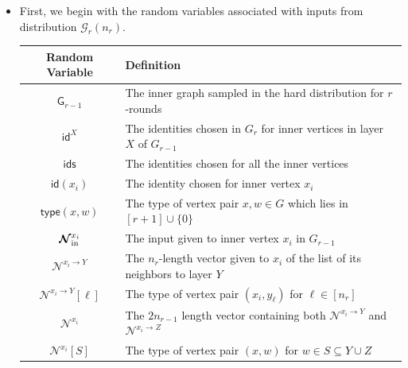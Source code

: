 \documentclass[11pt]{article}
\theoremstyle{definition}
\newcommand{\rv}[1]{\ensuremath{{\mathsf{#1}}}\xspace}
\newcommand{\rtypeval}[1]{\ensuremath{\rv{type}(#1)}}
\newcommand{\rNbtogether}[2]{\ensuremath{\bm{\mathcal{N}}^{#1_{#2}}}}
\newcommand{\rNinner}[2]{\ensuremath{\bm{\mathcal{N}}_{\textnormal{in}}^{#1_{#2}}}}
\newcommand{\cG}{\ensuremath{\mathcal{G}}}
\newcommand{\ridlayer}[1]{\ensuremath{\rv{id}^{#1}}}
\newcommand{\rG}{\ensuremath{\rv{G}}}
\newcommand{\rid}[1]{\ensuremath{\rv{id}(#1)}}
\newcommand{\rids}{\ensuremath{\rv{ids}}}
\newcommand{\rNbhood}[3]{\ensuremath{\bm{\mathcal{N}}^{#1_{#3} \to #2}}}
\begin{document}
\begin{itemize}
\item First, we begin with the random variables associated with inputs from distribution $\cG_r(n_r)$.
\begin{center}
\begin{tabular}{|c|p{10cm}|}
	\hline
\textbf{Random Variable}  & \textbf{Definition} \\
	\hline
$\rG_{r-1}$ & The inner graph sampled in the hard distribution for $r$-rounds \\
$\ridlayer{X}$ & The identities chosen in $G_r$ for inner vertices in layer $X$ of $G_{r-1}$ \\
$\rids$ & The identities chosen for all the inner vertices \\
$\rid{x_i}$ & The identity chosen for inner vertex $x_i$ \\
$\rtypeval{x, w}$ & The type of vertex pair $x, w \in G$ which lies in $[r+1] \cup \{0\}$ \\
$\rNinner{x}{i}$ & The input given to inner vertex $x_i$ in $G_{r-1}$ \\
$\rNbhood{x}{Y}{i}$	 & The $n_r$-length vector given to $x_i$ of the list of its neighbors to layer $Y$ \\
$\rNbhood{x}{Y}{i}[\ell]$ &The type of vertex pair $(x_i, y_{\ell})$ for $\ell \in [n_r]$ \\
$\rNbtogether{x}{i}$ & The $2n_{r-1}$ length vector containing both $\rNbhood{x}{Y}{i}$ and $\rNbhood{x}{Z}{i}$ \\
$\rNbtogether{x}{i}[S]$ & The type of vertex pair $(x, w)$ for $w \in S \subseteq Y \cup Z$ \\
\hline
\end{tabular}
\end{center}


\end{itemize}
\end{document}
